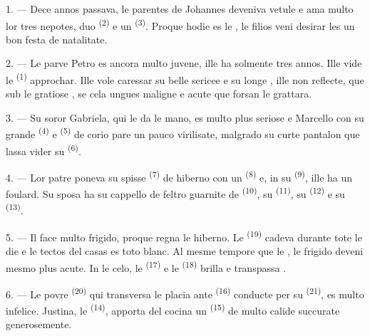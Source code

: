\VUsaut{3.0mm}

1. --- Dece annos passava, le parentes de Johannes deveniva vetule e ama multo
lor tres nepotes, duo  \textsuperscript{(2)} e un
 \textsuperscript{(3)}. Proque hodie es le , le filios veni desirar les un bon festa de natalitate.

2. --- Le parve Petro es ancora multo juvene, ille ha solmente tres annos. Ille
vide le  \textsuperscript{(1)} approchar. Ille vole caressar su
belle  sericee e su longe , ille non reflecte, que
sub le gratiose , se cela ungues maligne e acute que forsan le
grattara.

3. --- Su soror Gabriela, qui le da le mano, es multo plus seriose e Marcello
con su grande  \textsuperscript{(4)} e 
\textsuperscript{(5)} de corio pare un pauco virilisate, malgrado su curte
pantalon que lassa vider su  \textsuperscript{(6)}.

4. --- Lor patre poneva su spisse  \textsuperscript{(7)} de
hiberno con un  \textsuperscript{(8)} e, in su
 \textsuperscript{(9)}, ille ha un foulard. Su sposa ha su
cappello de feltro guarnite de  \textsuperscript{(10)}, su
 \textsuperscript{(11)}, su 
\textsuperscript{(12)} e su  \textsuperscript{(13)}.

5. --- Il face multo frigido, proque regna le hiberno. Le 
\textsuperscript{(19)} cadeva durante tote le die e le tectos del casas es toto
blanc. Al mesme tempore que le , le frigido deveni mesmo plus
acute. In le celo, le  \textsuperscript{(17)} e le 
\textsuperscript{(18)} brilla e transpassa .

\VUsaut{4.2mm}
\VUsaut{3.0mm}

6. --- Le povre  \textsuperscript{(20)} qui transversa le placia
ante  \textsuperscript{(16)} conducte per su
 \textsuperscript{(21)}, es multo infelice. Justina, le
 \textsuperscript{(14)}, apporta del cocina un
 \textsuperscript{(15)} de multo calide 
succurate generosemente.


